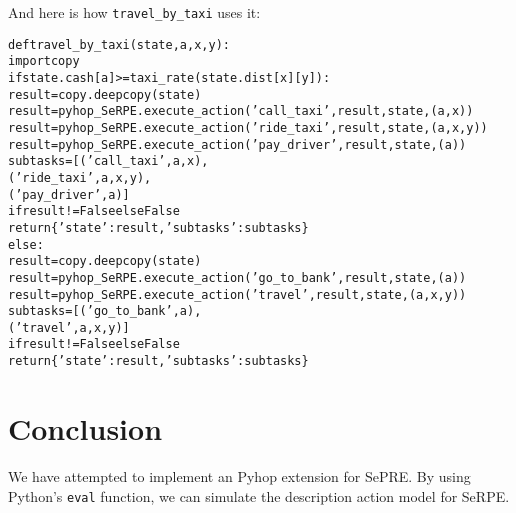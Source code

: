 \documentclass[11pt]{article} %
\begin{document}
And here is how \texttt{travel\_by\_taxi} uses it:
{\small
\begin{alltt}
def travel_by_taxi(state, a, x, y):
    import copy
    if state.cash[a] >= taxi_rate(state.dist[x][y]):
        result = copy.deepcopy(state)
        result = pyhop_SeRPE.execute_action('call_taxi', result, state, (a, x))
        result = pyhop_SeRPE.execute_action('ride_taxi', result, state, (a, x, y))
        result = pyhop_SeRPE.execute_action('pay_driver', result, state, (a))
        subtasks = [('call_taxi', a, x),
                    ('ride_taxi', a, x, y),
                    ('pay_driver', a)]
                   if result != False else False
        return \{'state':result, 'subtasks':subtasks\}
    else:
        result = copy.deepcopy(state)
        result = pyhop_SeRPE.execute_action('go_to_bank', result, state, (a))
        result = pyhop_SeRPE.execute_action('travel', result, state, (a, x, y))
        subtasks = [('go_to_bank', a),
                    ('travel', a, x, y)]
                   if result != False else False
        return \{'state':result, 'subtasks':subtasks\}
\end{alltt}}

\section{Conclusion}

We have attempted to implement an Pyhop extension for SePRE.
By using Python's \texttt{eval} function, we can simulate the description 
action model for SeRPE.



\end{document}
